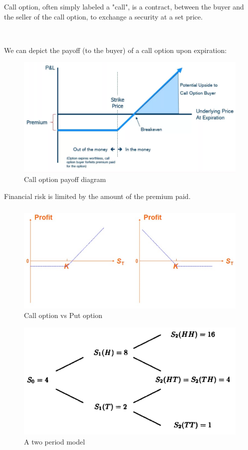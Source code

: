 \documentclass[c, dvipsnames, 8pt]{beamer}
\begin{document}
\begin{frame}[shrink=5]
\frametitle{\insertsection} 
\framesubtitle{\insertsubsection} 

Call option, often simply labeled a "call", is a contract, between the buyer and the seller of the call option, to exchange a security at a set price.

\

We can depict the payoff (to the buyer) of a call option upon expiration:


\begin{figure}
	\centering
	\includegraphics[width=0.9\linewidth]{screenshot001}
	\caption[Call option payoff diagram]{Call option payoff diagram}
	\label{fig:screenshot001}
\end{figure}


Financial risk is limited by the amount of the premium paid. 



\end{frame}	

\begin{frame}[shrink=5]
\frametitle{\insertsection} 
\framesubtitle{\insertsubsection} 

\begin{figure}
	\centering
	\includegraphics[width=0.6\linewidth]{screenshot003}
	\caption[Call option vs Put option]{Call option vs Put option}
	\label{fig:screenshot001}
\end{figure}

\begin{figure}
	\centering
	\includegraphics[width=0.4\linewidth]{screenshot002}
	\caption[A two period model]{A two period model}
	\label{fig:screenshot001}
\end{figure}


\end{frame}	
\end{document}
